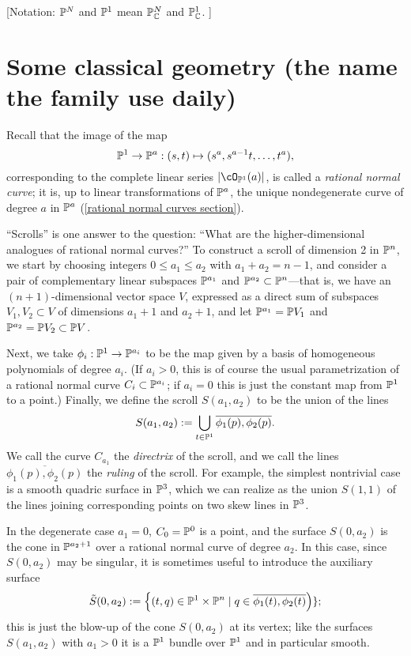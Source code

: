 [Notation:  $\PP^{N}$ and $\PP^{1}$ mean $\PP_{\CC}^{N}$ and $\PP_{\CC}^{1}$. ]

\section{Some classical geometry (the name the family use daily)}\label{daily name}

Recall that the image of the map 
$$
\PP^1\to\PP^a: (s,t) \mapsto (s^a, s^{a-1}t, \dots, t^a),
$$
corresponding to the complete linear series
$|\cO_{\PP^1}(a)|$, is called a \emph{rational normal curve}; it is, up to linear transformations of $\PP^a$, the unique nondegenerate curve of degree $a$ in $\PP^a$ (\ref{rational normal curves section}).

``Scrolls'' is one answer to the question: ``What are the higher-dimensional analogues of rational normal curves?'' To construct a scroll of dimension 2 in $\PP^n$, we start by choosing integers $0\leq a_1 \leq a_2$ with $a_1 + a_2 = n-1$, and consider  a pair of complementary linear subspaces $\PP^{a_1}$ and $\PP^{a_2} \subset \PP^n$---that is, we have an $(n+1)$-dimensional vector space $V$, expressed as a direct sum of subspaces $V_1, V_2 \subset V$ of dimensions $a_1+1$ and $a_2+1$, and let $\PP^{a_1} = \PP V_1$ and $\PP^{a_2} = \PP V_2 \subset \PP V$.

Next, we take $\phi_i : \PP^1 \to \PP^{a_i}$ to be the map given by a basis of homogeneous polynomials of degree $a_i$. (If $a_i > 0$, this is of course the usual parametrization of a rational normal curve $C_i \subset \PP^{a_i}$; if $a_i = 0$ this is just the constant map from $\PP^1$ to a point.) Finally, we define the scroll $S(a_1, a_2)$ to be the union of the lines
$$
S(a_1,a_2) := \bigcup_{t\in \PP^1} \overline{\phi_1(p), \phi_2(p)}.
$$
We call the curve $C_{a_{1}}$ the \emph{directrix} of the scroll, and we call the lines $ \overline{\phi_1(p), \phi_2(p)}$ the \emph{ruling} of the scroll. For example, the simplest nontrivial case is a smooth quadric surface in $\PP^3$, which we can realize as the union $S(1,1)$ of the lines joining corresponding points on two skew lines in $\PP^3$. 

In the degenerate case $a_{1}= 0$, $C_{0}= \PP^{0}$ is a point, and the surface $S(0,a_{2})$ is the cone
in $\PP^{a_{2}+1}$ over a rational normal curve of degree $a_{2}$. In this case, since $S(0,a_2)$ may be singular, it is sometimes useful to introduce the auxiliary surface
$$
\tilde S(0, a_2) := \left\{ (t, q) \in \PP^1 \times \PP^n  \mid q \in \overline{\phi_1(t), \phi_2(t)}\right)\};
$$
this is just the blow-up of the cone $S(0, a_2)$ at its vertex; like the surfaces $S(a_1,a_2)$ with $a_1 > 0$ it is a $\PP^1$ bundle over $\PP^1$ and in particular smooth.


